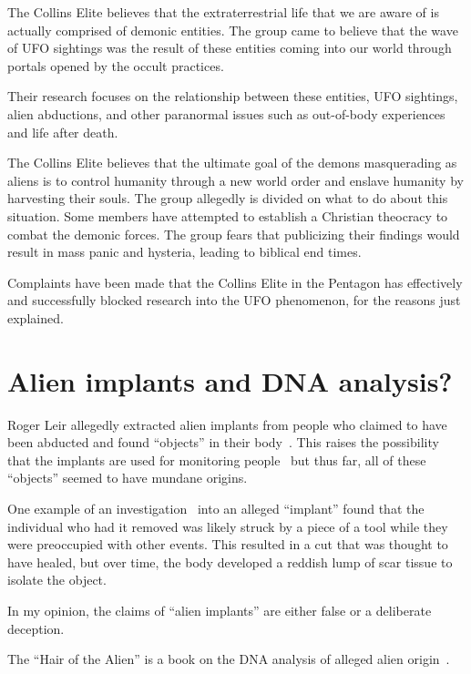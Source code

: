 The Collins Elite believes that the extraterrestrial life that we are aware of is actually comprised of demonic entities.
The group  came to believe that the wave of UFO sightings was the result of these entities coming into our world through portals
opened by the occult practices.

Their research focuses on the relationship between these entities, UFO sightings,
alien abductions, and other paranormal issues such as out-of-body experiences and life after death.

The Collins Elite believes that the ultimate goal of the demons masquerading as aliens
is to control humanity through a new world order and enslave humanity by harvesting their souls.
The group allegedly is divided on what to do about this situation.
Some members have attempted to establish a Christian theocracy to combat the demonic forces.
The group fears that publicizing their findings would result in mass panic and hysteria,
leading to biblical end times.


Complaints have been made that the Collins Elite in the Pentagon has effectively and successfully blocked research into
the UFO phenomenon, for the reasons just explained.

\section{Alien implants and DNA analysis?}
\label{2023-UFO-part-Perception-abductions-alim}

Roger Leir allegedly extracted alien implants from people who claimed to have been abducted and
found ``objects'' in their body~\cite{Leir2000}.
This raises the possibility that the implants are used for monitoring people~\cite{DolanDisclosure2018Sep} but
thus far, all of these ``objects'' seemed to have mundane origins.

One example of an investigation~\cite{ScottLittle-implant} into an alleged ``implant'' found that the individual who had it removed was likely struck by a piece of a tool while they were preoccupied with other events. This resulted in a cut that was thought to have healed, but over time, the body developed a reddish lump of scar tissue to isolate the object.

In my opinion, the claims of ``alien implants'' are either false or a deliberate deception.

The ``Hair of the Alien'' is a book on the DNA analysis of alleged alien origin~\cite{Chalker2005Jul}.

